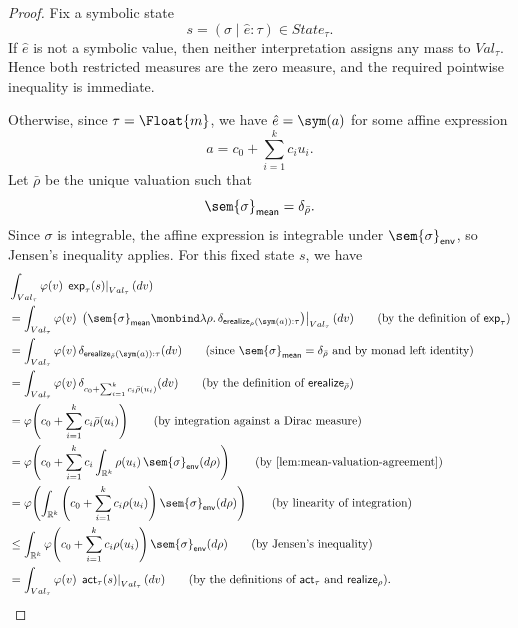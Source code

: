 \begin{proof}
  Fix a symbolic state
  \[
    s=(\sigma\mid\hat e:\tau)\in State_\tau.
  \]
  If $\hat e$ is not a symbolic value, then neither interpretation assigns
  any mass to $Val_\tau$. Hence both restricted measures are the zero
  measure, and the required pointwise inequality is immediate.

  Otherwise, since $\tau=\Float{m}$, we have $\hat e=\sym(a)$ for some
  affine expression
  \[
    a=c_0+\sum_{i=1}^k c_i u_i.
  \]
  Let $\bar\rho$ be the unique valuation such that
  \[
    \sem{\sigma}_{\mathsf{mean}}=\delta_{\bar\rho}.
  \]
  Since $\sigma$ is integrable, the affine expression is integrable under
  $\sem{\sigma}_{\mathsf{env}}$, so Jensen's inequality applies. For this
  fixed state $s$, we have
  \begin{align}
    &\int_{Val_\tau}
      \varphi(v)\,
      \left.\mathsf{exp}_\tau(s)\right|_{Val_\tau}(dv)
    \notag
    \\
    &=
    \int_{Val_\tau}
      \varphi(v)\,
      \left.
        \left(
          \sem{\sigma}_{\mathsf{mean}}
          \monbind
          \lambda\rho.\,
          \delta_{\mathsf{erealize}_\rho(\sym(a)):\tau}
        \right)
      \right|_{Val_\tau}(dv)
    \tag{\text{by the definition of $\mathsf{exp}_\tau$}}
    \\
    &=
    \int_{Val_\tau}
      \varphi(v)\,
      \delta_{\mathsf{erealize}_{\bar\rho}(\sym(a)):\tau}(dv)
    \tag{\text{since $\sem{\sigma}_{\mathsf{mean}}=\delta_{\bar\rho}$ and by monad left identity}}
    \\
    &=
    \int_{Val_\tau}
      \varphi(v)\,
      \delta_{c_0+\sum_{i=1}^k c_i\bar\rho(u_i)}(dv)
    \tag{\text{by the definition of $\mathsf{erealize}_{\bar\rho}$}}
    \\
    &=
    \varphi\!\left(
      c_0+\sum_{i=1}^k c_i\bar\rho(u_i)
    \right)
    \tag{\text{by integration against a Dirac measure}}
    \\
    &=
    \varphi\!\left(
      c_0+
      \sum_{i=1}^k c_i
      \int_{\mathbb R^k}
        \rho(u_i)\,
        \sem{\sigma}_{\mathsf{env}}(d\rho)
    \right)
    \tag{\text{by \Cref{lem:mean-valuation-agreement}}}
    \\
    &=
    \varphi\!\left(
      \int_{\mathbb R^k}
        \left(
          c_0+\sum_{i=1}^k c_i\rho(u_i)
        \right)
        \sem{\sigma}_{\mathsf{env}}(d\rho)
    \right)
    \tag{\text{by linearity of integration}}
    \\
    &\leq
    \int_{\mathbb R^k}
      \varphi\!\left(
        c_0+\sum_{i=1}^k c_i\rho(u_i)
      \right)
      \sem{\sigma}_{\mathsf{env}}(d\rho)
    \tag{\text{by Jensen's inequality}}
    \\
    &=
    \int_{Val_\tau}
      \varphi(v)\,
      \left.\mathsf{act}_\tau(s)\right|_{Val_\tau}(dv)
    \tag{\text{by the definitions of $\mathsf{act}_\tau$ and $\mathsf{realize}_\rho$}}.
  \end{align}


\end{proof}
